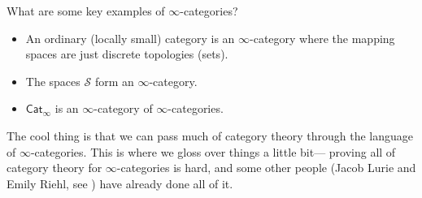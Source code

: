 \begin{example}
    What are some key examples of $\infty$-categories?
    \begin{itemize}
\setlength\itemsep{-.2em}
        \item An ordinary (locally small) category is an $\infty$-category where the mapping spaces are just discrete topologies (sets).
        \item The spaces $\mathcal{S} $ form an $\infty$-category.
        \item $\mathsf{Cat} _{\infty}$ is an $\infty$-category of $\infty$-categories.
    \end{itemize}
\end{example}
The cool thing is that we can pass much of category theory through the language of $\infty$-categories. This is where we gloss over things a little bit--- proving all of category theory for $\infty$-categories is hard, and some other people (Jacob Lurie and Emily Riehl, see \cite{lurie} ) have already done all of it.
